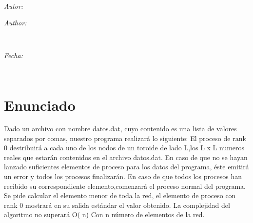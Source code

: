 \documentclass[11pt]{article}
\makeatletter
\newif\ifspanish %
\newif\ifmultipleauthors %
\newcommand{\dateText}{Fecha:}
\newcommand{\dateText}{Date:}
\let\theauthor\@author
\let\thedate\@date
\makeatother
\begin{document}
\begin{titlepage}
	\vspace*{\fill}
	\begin{minipage}{0.4\textwidth}
		\begin{flushleft} \large
			\ifspanish
				\ifmultipleauthors
					\emph{Autores:}\\
				\else
					\emph{Autor:}\\
				\fi
			\else
				\ifmultipleauthors
					\emph{Authors:}\\
				\else
					\emph{Author:}\\
				\fi
			\fi
			\theauthor
			\end{flushleft}
			\end{minipage}~
			\begin{minipage}{0.4\textwidth}
			\begin{flushright} \large
			\emph{\dateText} \\
			\thedate
		\end{flushright}
	\end{minipage}\\[2.25 cm]


\end{titlepage}


\tableofcontents
\pagebreak


\section{Enunciado}
Dado un archivo con nombre datos.dat, cuyo contenido es una lista de valores separados por comas, nuestro programa realizará lo siguiente: El proceso de rank 0 destribuirá a cada uno de los nodos de un toroide de lado L,los L x L numeros reales que estarán contenidos en el archivo datos.dat. En caso de que no se hayan lanzado suficientes elementos de proceso
para los datos del programa, éste emitirá un error y todos los procesos finalizarán. En caso de que todos los procesos han recibido su correspondiente elemento,comenzará el proceso normal del programa. Se pide calcular el elemento menor de toda la red, el elemento de proceso con rank 0 mostrará en su salida estándar el valor obtenido. 
La complejidad del algoritmo no superará O( n) Con n número de elementos de la red.


\end{document}
